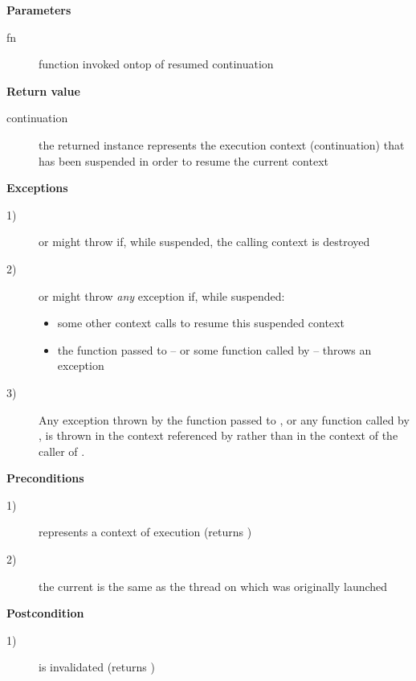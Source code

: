 {\bfseries Parameters}
\begin{description}
    \item[fn] function invoked ontop of resumed continuation\\
\end{description}

{\bfseries Return value}
\begin{description}
    \item[continuation] the returned instance represents the execution context
                        (continuation) that has been suspended in order to
                        resume the current context
\end{description}

{\bfseries Exceptions}
\begin{description}
    \item[1)] \resume or \resumewith might throw \unwindex if, while suspended,
              the calling context is destroyed
    \item[2)] \resume or \resumewith might throw \emph{any} exception if,
              while suspended:
              \begin{itemize}
                  \item some other context calls \resumewith to resume this
                        suspended context
                  \item the function  passed to \resumewith -- or some
                        function called by  -- throws an exception
              \end{itemize}
    \item[3)] Any exception thrown by the function  passed to
              \resumewith, or any function called by , is thrown in the
              context referenced by  rather than in the context of
              the caller of \resumewith.
\end{description}

{\bfseries Preconditions}
\begin{description}
    \item[1)]  represents a context of execution (\opbool returns
               )
    \item[2)] the current  is the same as the thread on which
               was originally launched
\end{description}

{\bfseries Postcondition}
\begin{description}
    \item[1)]  is invalidated (\opbool returns )
\end{description}

